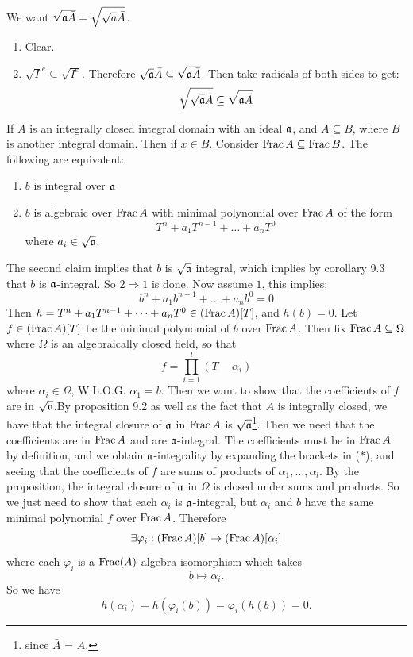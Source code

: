 \documentclass{article}
\begin{document}
\proof We want $\sqrt{\mathfrak{a} \bar A} = \sqrt{\sqrt{a} \bar A}$. \begin{enumerate}
    \item[$\subseteq$:] Clear.
    \item[$\supseteq$:] $\sqrt{I}^{e} \subseteq \sqrt{I^{e}}$. Therefore $\sqrt{\mathfrak{a}} \bar A \subseteq \sqrt{\mathfrak{a} \bar A}$. Then take radicals of both sides to get: \[ \sqrt{\sqrt{\mathfrak{a}} \bar A} \subseteq \sqrt{\mathfrak{a} \bar A}\]
\end{enumerate}
\endproof
\begin{fancyprop}{}
    If $A$ is an integrally closed integral domain with an ideal $\mathfrak{a}$, and $A \subseteq B$, where $B$ is another integral domain. Then if $x \in B$. Consider $\operatorname{Frac} A \subseteq \operatorname{Frac} B$. The following are equivalent:
    \begin{enumerate}
        \item $b$ is integral over $\mathfrak{a}$
        \item $b$ is algebraic over $\operatorname{Frac} A$ with minimal polynomial over $\operatorname{Frac} A$ of the form \[ T^{n} + a_{1}T^{n-1} + \dots + a_{n}T^{0}\]
        where $a_{i} \in \sqrt{\mathfrak{a}}$.
    \end{enumerate}
\end{fancyprop}
\proof The second claim implies that $b$ is $\sqrt{\mathfrak{a}}$ integral, which implies by corollary 9.3 that $b$ is $\mathfrak{a}$-integral. So $2 \Rightarrow 1$ is done.\gap 
Now assume $1$, this implies: \[ b^{n} + a_{1}b^{n-1} + \dots + a_{n}b^{0} = 0\] Then $h = T^{n} + a_{1}T^{n-1} + \dots + a_{n}T^{0} \in (\operatorname{Frac} A)[T]$, and $h(b) = 0$. Let $f \in (\operatorname{Frac} A)[T]$ be the minimal polynomial of $b$ over $\operatorname{Frac} A$. Then fix $\operatorname{Frac} A \subseteq \Omega$ where $\Omega$ is an algebraically closed field, so that \[ f = \prod_{i=1}^{l} (T-\alpha_{i}) \tag{$*$}\] where $\alpha_{i} \in \Omega$, W.L.O.G. $\alpha_{1}=b$. Then we want to show that the coefficients of $f$ are in $\sqrt{\mathfrak{a}}$.\gap By proposition 9.2 as well as the fact that $A$ is integrally closed, we have that the integral closure of $\mathfrak{a}$ in $\operatorname{Frac} A$ is $\sqrt{\mathfrak{a}}$\footnote{since $\bar A$ = $A$.}. Then we need that the coefficients are in $\operatorname{Frac} A$ and are $\mathfrak{a}$-integral. The coefficients must be in $\operatorname{Frac} A$ by definition, and we obtain $\mathfrak{a}$-integrality by expanding the brackets in ($*$), and seeing that the coefficients of $f$ are sums of products of $\alpha_{1}, \dots, \alpha_{l}$. By the proposition, the integral closure of $\mathfrak{a}$ in $\Omega$ is closed under sums and products. So we just need to show that each $\alpha_{i}$ is $\mathfrak{a}$-integral, but $\alpha_{i}$ and $b$ have the same minimal polynomial $f$ over $\operatorname{Frac} A$. Therefore \[ \exists \varphi_{i} : (\operatorname{Frac} A)[b] \to (\operatorname{Frac} A)[\alpha_{i}] \] where each $\varphi_{i}$ is a $\operatorname{Frac}(A)$-algebra isomorphism which takes \[ b \mapsto \alpha_{i}.\] So we have \[h(\alpha_{i}) = h(\varphi_{i}(b)) = \varphi_{i}(h(b)) = 0.\]
\endproof 
\end{document}

